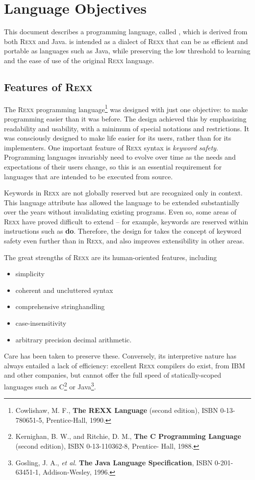 \section{Language Objectives}
This document describes a programming language, called \nr{}, which
is derived from both R\textsc{exx} and Java. \nr{} is intended as a dialect
of R\textsc{exx} that can be as efficient and portable as languages such as
Java, while preserving the low threshold to learning and the ease of
use of the original R\textsc{exx} language.
\subsection{Features of R\textsc{exx}}
The R\textsc{exx} programming language\footnote{Cowlishaw, M. F., \textbf{The REXX Language} (second edition), ISBN 0-13-780651-5, Prentice-Hall, 1990.} was designed with just one objective: to make programming easier than it was before. The design achieved this by emphasizing readability and usability, with a minimum of special notations and restrictions. It was consciously designed to make life easier for its users, rather than for its implementers.
One important feature of R\textsc{exx} syntax is \emph{keyword
  safety}. Programming languages invariably need to evolve over time
as the needs and expectations of their users change, so this is an
essential requirement for languages that are intended to be executed from source.

Keywords in R\textsc{exx} are not globally reserved but are recognized only in
context. This language attribute has allowed the language to be
extended substantially over the years without invalidating existing
programs. Even so, some areas of R\textsc{exx} have proved difficult to extend
– for example, keywords are reserved within instructions such as
\textbf{do}. Therefore, the design for \nr{} takes the concept of
keyword safety even further than in R\textsc{exx}, and also improves
extensibility in other areas.

The great strengths of R\textsc{exx} are its human-oriented features, including 
\begin{itemize}
\item simplicity
\item coherent and uncluttered syntax
\item comprehensive stringhandling
\item case-insensitivity
\item arbitrary precision decimal arithmetic.
\end{itemize}
Care has been taken to preserve these. Conversely, its interpretive
nature has always entailed a lack of efficiency: excellent R\textsc{exx}
compilers do exist, from IBM and other companies, but cannot offer the
full speed of statically-scoped languages such as
C\footnote{Kernighan, B. W., and Ritchie, D. M., \textbf{The C
    Programming Language} (second edition), ISBN 0-13-110362-8,
  Prentice- Hall, 1988.} or Java\footnote{Gosling, J. A., \emph{et
    al.} \textbf{The Java Language Specification}, ISBN 0-201-63451-1,
  Addison-Wesley, 1996.}.
